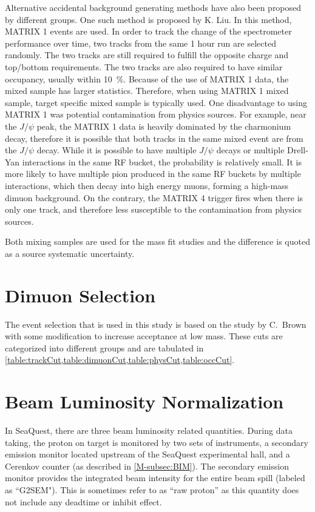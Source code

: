 \documentclass[../main.tex]{subfiles}
\begin{document}
Alternative accidental background generating methods have also been proposed by different groups.
One such method is proposed by K. Liu. In this method, MATRIX 1 events are used. In order to track the
change of the spectrometer performance over time, two tracks from the same 1 hour run are selected
randomly. The two tracks are still required to fulfill the opposite charge and top/bottom requirements.
The two tracks are also required to have similar occupancy, usually within \SI{10}{\percent}.
Because of the use of MATRIX 1 data, the mixed sample has larger statistics. Therefore, when
using MATRIX 1 mixed sample, target specific mixed sample is typically used. One disadvantage to using MATRIX 1
was potential contamination from physics sources. For example, near the $J/\psi$ peak, the MATRIX 1
data is heavily dominated by the charmonium decay, therefore it is possible that both tracks in the same
mixed event are from the $J/\psi$ decay. While it is possible to have multiple $J/\psi$ decays or
multiple Drell-Yan interactions in the same RF bucket,
the probability is relatively small. It is more likely to have multiple pion produced in the same RF
buckets by multiple interactions, which then decay into high energy muons, forming a high-mass
dimuon background.
On the contrary, the MATRIX 4 trigger fires when there is only one track, and therefore less
susceptible to the contamination from physics sources.

Both mixing samples are used for the mass fit studies and the difference is quoted as a source systematic
uncertainty.

\section{Dimuon Selection}
The event selection that is used in this study is based on the study by C.~Brown
\cite{chuck-2111} with some modification to increase acceptance at low mass. These cuts
are categorized into different groups and are tabulated in \cref{table:trackCut,table:dimuonCut,table:physCut,table:occCut}.





\FloatBarrier
\section{Beam Luminosity Normalization}
\label{sec:beam_norm}
In SeaQuest, there are three beam luminosity related quantities.
During data taking, the proton on target is monitored by two sets of instruments, a secondary
emission monitor located upstream of the SeaQuest experimental hall, and a Cerenkov counter
(as described in \cref{M-subsec:BIM}). The secondary emission monitor provides the integrated
beam intensity for the entire beam spill (labeled as ``G2SEM"). This is sometimes refer to as
``raw proton'' as this quantity does not include any deadtime or inhibit effect.
\end{document}
